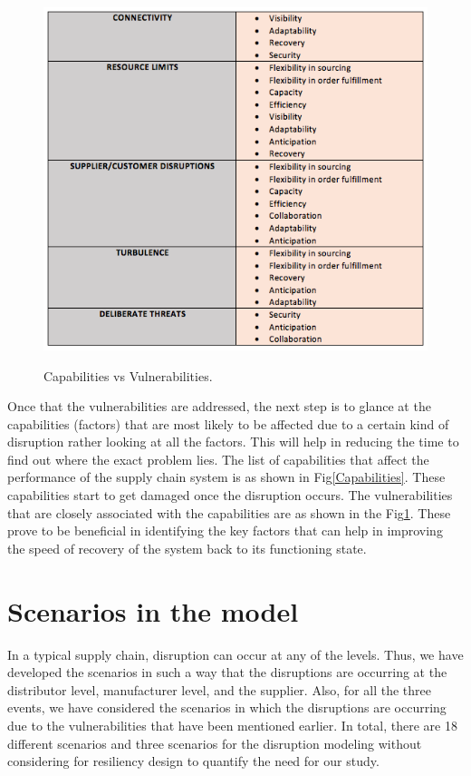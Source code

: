 \begin{figure}[H]
  \centering
  \includegraphics[width=6.0in]{figures/pdf/CV.png}\\
  \caption{Capabilities vs Vulnerabilities.}\label{CV}
\end{figure}


Once that the vulnerabilities are addressed, the next step is to glance at the capabilities (factors) that are most likely to be affected due to a certain kind of disruption rather looking at all the factors. This will help in reducing the time to find out where the exact problem lies. The list of capabilities that affect the performance of the supply chain system is as shown in Fig\ref{Capabilities}. These capabilities start to get damaged once the disruption occurs. The vulnerabilities that are closely associated with the capabilities are as shown in the Fig\ref{CV}. These prove to be beneficial in identifying the key factors that can help in improving the speed of recovery of the system back to its functioning state.


\section{Scenarios in the model}
In a typical supply chain, disruption can occur at any of the levels. Thus, we have developed the scenarios in such a way that the disruptions are occurring at the distributor level, manufacturer level, and the supplier. Also, for all the three events, we have considered the scenarios in which the disruptions are occurring due to the vulnerabilities that have been mentioned earlier. In total, there are 18 different scenarios and three scenarios for the disruption modeling without considering for resiliency design to quantify the need for our study.

